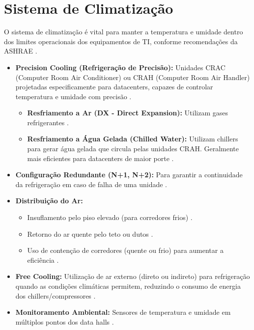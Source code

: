 \documentclass[
	12pt,				%
	oneside,			%
	a4paper,			%
	english,			%
	brazil				%
	]{abntex2unama}
\begin{document}
\section{Sistema de Climatização}
O sistema de climatização é vital para manter a temperatura e umidade dentro dos limites operacionais dos equipamentos de TI, conforme recomendações da ASHRAE \cite{cooling_technologies}.
\begin{itemize}
	\item \textbf{Precision Cooling (Refrigeração de Precisão):} Unidades CRAC (Computer Room Air Conditioner) ou CRAH (Computer Room Air Handler) projetadas especificamente para datacenters, capazes de controlar temperatura e umidade com precisão \cite{liquid_cooling}.
	      \begin{itemize}
		      \item \textbf{Resfriamento a Ar (DX - Direct Expansion):} Utilizam gases refrigerantes \cite{cooling_technologies}.
		      \item \textbf{Resfriamento a Água Gelada (Chilled Water):} Utilizam chillers para gerar água gelada que circula pelas unidades CRAH. Geralmente mais eficientes para datacenters de maior porte \cite{liquid_cooling}.
	      \end{itemize}
	\item \textbf{Configuração Redundante (N+1, N+2):} Para garantir a continuidade da refrigeração em caso de falha de uma unidade \cite{reliability_engineering}.
	\item \textbf{Distribuição do Ar:}
	      \begin{itemize}
		      \item Insuflamento pelo piso elevado (para corredores frios) \cite{cooling_technologies}.
		      \item Retorno do ar quente pelo teto ou dutos \cite{energy_efficiency}.
		      \item Uso de contenção de corredores (quente ou frio) para aumentar a eficiência \cite{green_datacenters}.
	      \end{itemize}
	\item \textbf{Free Cooling:} Utilização de ar externo (direto ou indireto) para refrigeração quando as condições climáticas permitem, reduzindo o consumo de energia dos chillers/compressores \cite{green_datacenters}.
	\item \textbf{Monitoramento Ambiental:} Sensores de temperatura e umidade em múltiplos pontos dos data halls \cite{dcim_systems}.
\end{itemize}
\end{document}
